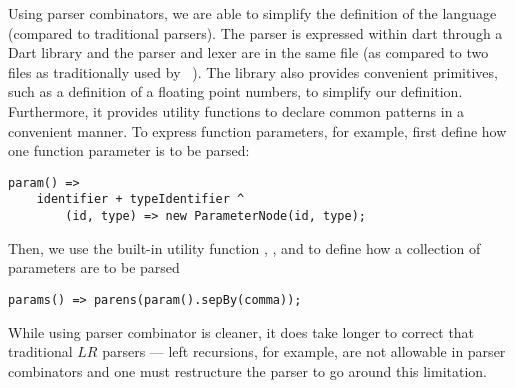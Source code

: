 
Using parser combinators, we are able to simplify the definition of 
	the language (compared to traditional  parsers).
The parser is expressed within dart through a Dart library and
	the parser and lexer are in the same file (as compared to two
	files as traditionally used by ~\cite{lexyacc}).
The library also provides convenient primitives, such as a definition of
	a floating point numbers, to simplify our definition.
Furthermore, it provides utility functions to declare common patterns
	in a convenient manner.
To express function parameters, for example, first define how one function
	parameter is to be parsed:

\begin{verbatim}
param() =>
    identifier + typeIdentifier ^
        (id, type) => new ParameterNode(id, type); 
\end{verbatim}

Then, we use the built-in utility function , ,
	and  to define how a collection of parameters are
	to be parsed

\begin{verbatim}
params() => parens(param().sepBy(comma));
\end{verbatim}

While using parser combinator is cleaner, it does take longer to correct
	that traditional $LR$ parsers --- left recursions, for example, are
	not allowable in parser combinators and one must restructure the parser
	to go around this limitation.
